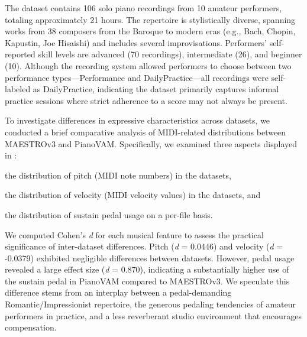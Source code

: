 \documentclass{article}
\begin{document}
The dataset contains 106 solo piano recordings from 10 amateur performers, totaling approximately 21 hours. The repertoire is stylistically diverse, spanning works from 38 composers from the Baroque to modern eras (e.g., Bach, Chopin, Kapustin, Joe Hisaishi) and includes several improvisations. Performers' self-reported skill levels are advanced (70 recordings), intermediate (26), and beginner (10). Although the recording system allowed performers to choose between two performance types—Performance and DailyPractice—all recordings were self-labeled as DailyPractice, indicating the dataset primarily captures informal practice sessions where strict adherence to a score may not always be present. %

To investigate differences in expressive characteristics across datasets, we conducted a brief comparative analysis of MIDI-related distributions between MAESTROv3 and PianoVAM. Specifically, we examined three aspects displayed in : 
\begin{inparaenum}[(i)]
    \item the distribution of pitch (MIDI note numbers) in the datasets, 
    \item the distribution of velocity (MIDI velocity values) in the datasets, and 
    \item the distribution of sustain pedal usage on a per-file basis.
\end{inparaenum}
We computed Cohen's \textit{d} for each musical feature to assess the practical significance of inter-dataset differences.  Pitch (\textit{d} = 0.0446) and velocity (\textit{d} = -0.0379) exhibited negligible differences between datasets. However, pedal usage revealed a large effect size (\textit{d} = 0.870), indicating a substantially higher use of the sustain pedal in PianoVAM compared to MAESTROv3. We speculate this difference stems from an interplay between a pedal-demanding Romantic/Impressionist repertoire, the generous pedaling tendencies of amateur performers in practice, and a less reverberant studio environment that encourages compensation. %
 
\end{document}
